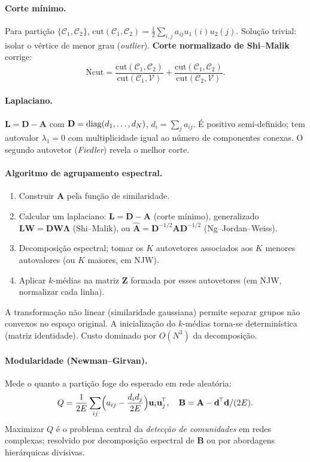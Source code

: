 \paragraph{Corte mínimo.} Para partição $\{\mathcal{C}_1,\mathcal{C}_2\}$,
$\mathrm{cut}(\mathcal{C}_1,\mathcal{C}_2)=\frac12\sum_{i,j}a_{ij}u_1(i)u_2(j)$.
Solução trivial: isolar o vértice de menor grau (\emph{outlier}).
\textbf{Corte normalizado de Shi--Malik} corrige:
\[
\mathrm{Ncut}=\frac{\mathrm{cut}(\mathcal{C}_1,\mathcal{C}_2)}{\mathrm{cut}(\mathcal{C}_1,\mathcal{V})}
+\frac{\mathrm{cut}(\mathcal{C}_1,\mathcal{C}_2)}{\mathrm{cut}(\mathcal{C}_2,\mathcal{V})}.
\]

\paragraph{Laplaciano.} $\mathbf{L}=\mathbf{D}-\mathbf{A}$ com
$\mathbf{D}=\operatorname{diag}(d_1,\dots,d_N)$, $d_i=\sum_j a_{ij}$. É positivo
semi-definido; tem autovalor $\lambda_1=0$ com multiplicidade igual ao
número de componentes conexas. O segundo autovetor (\emph{Fiedler})
revela o melhor corte.

\paragraph{Algoritmo de agrupamento espectral.}
\begin{enumerate}[leftmargin=1.2cm]
  \item Construir $\mathbf{A}$ pela função de similaridade.
  \item Calcular um laplaciano: $\mathbf{L}=\mathbf{D}-\mathbf{A}$ (corte mínimo), generalizado $\mathbf{L}\mathbf{W}=\mathbf{D}\mathbf{W}\boldsymbol\Lambda$ (Shi--Malik), ou $\hat{\mathbf{A}}=\mathbf{D}^{-1/2}\mathbf{A}\mathbf{D}^{-1/2}$ (Ng--Jordan--Weiss).
  \item Decomposição espectral; tomar os $K$ autovetores associados aos $K$ menores autovalores (ou $K$ maiores, em NJW).
  \item Aplicar $k$-médias na matriz $\mathbf{Z}$ formada por esses autovetores (em NJW, normalizar cada linha).
\end{enumerate}
A transformação não linear (similaridade gaussiana) permite separar
grupos não convexos no espaço original. A inicialização do $k$-médias
torna-se determinística (matriz identidade). Custo dominado por
$O(N^3)$ da decomposição.

\paragraph{Modularidade (Newman--Girvan).} Mede o quanto a partição
foge do esperado em rede aleatória:
\[
Q=\frac{1}{2E}\sum_{ij}\Bigl(a_{ij}-\frac{d_id_j}{2E}\Bigr)\mathbf{u}_i\mathbf{u}_j^{\!\top},
\quad \mathbf{B}=\mathbf{A}-\mathbf{d}^{\!\top}\mathbf{d}/(2E).
\]
Maximizar $Q$ é o problema central da \emph{detecção de comunidades}
em redes complexas; resolvido por decomposição espectral de
$\mathbf{B}$ ou por abordagens hierárquicas divisivas.

